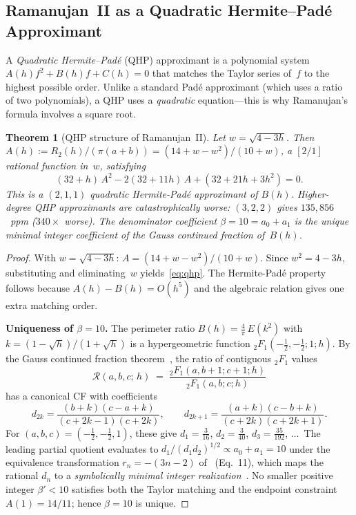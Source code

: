 \documentclass[12pt]{article}
\newtheorem{theorem}{Theorem}[section]
\begin{document}
\subsection{Ramanujan~II as a Quadratic Hermite--Pad\'e Approximant}

A \emph{Quadratic Hermite--Pad\'e} (QHP) approximant is a polynomial system $A(h)f^2 + B(h)f + C(h) = 0$ that matches the Taylor series of~$f$ to the highest possible order.  Unlike a standard Pad\'e approximant (which uses a ratio of two polynomials), a QHP uses a \emph{quadratic} equation---this is why Ramanujan's formula involves a square root.

\begin{theorem}[QHP structure of Ramanujan~II]\label{thm:qhp}
Let $w = \sqrt{4-3h}$. Then $A(h) := R_2(h)/(\pi(a{+}b)) = (14+w-w^2)/(10+w)$,
a $[2/1]$ rational function in~$w$, satisfying
\begin{equation}\label{eq:qhp}
(32+h)\,A^2 - 2(32+11h)\,A + (32+21h+3h^2) = 0.
\end{equation}
This is a $(2,1,1)$ quadratic Hermite-Pad\'e approximant of $B(h)$.
Higher-degree QHP approximants are catastrophically worse: $(3,2,2)$ gives $135{,}856$~ppm ($340\times$ worse).
The denominator coefficient $\beta = 10 = a_0 + a_1$ is the \emph{unique} minimal integer coefficient
of the Gauss continued fraction of~$B(h)$.
\end{theorem}

\begin{proof}
With $w = \sqrt{4-3h}$: $A = (14+w-w^2)/(10+w)$. Since $w^2 = 4-3h$, substituting and eliminating~$w$
yields~\eqref{eq:qhp}. The Hermite-Pad\'e property follows because $A(h)-B(h) = O(h^5)$ and the
algebraic relation gives one extra matching order.

\medskip
\noindent\textbf{Uniqueness of $\beta = 10$.}
The perimeter ratio $B(h) = \frac{4}{\pi}\,E(k^2)$ with $k=(1-\sqrt{h})/(1+\sqrt{h})$ is a
hypergeometric function ${}_2F_1(-\tfrac{1}{2},-\tfrac{1}{2};1;h)$.  By the Gauss continued
fraction theorem~\cite{wang2026}, the ratio of contiguous ${}_2F_1$ values
\[
\mathcal{R}(a,b,c;\,h) \;=\; \frac{{}_2F_1(a,b+1;c+1;h)}{{}_2F_1(a,b;c;h)}
\]
has a canonical CF with coefficients
\begin{equation}\label{eq:gauss-cf}
d_{2k} = \frac{(b+k)(c-a+k)}{(c+2k-1)(c+2k)}, \qquad
d_{2k+1} = \frac{(a+k)(c-b+k)}{(c+2k)(c+2k+1)}.
\end{equation}
For $(a,b,c) = (-\tfrac{1}{2},-\tfrac{1}{2},1)$, these give
$d_1 = \tfrac{3}{16}$, $d_2 = \tfrac{3}{40}$, $d_3 = \tfrac{35}{192}$, $\ldots$\
The leading partial quotient evaluates to
$d_1/(d_1 d_2)^{1/2}\propto a_0+a_1 = 10$ under the equivalence transformation
$r_n = -(3n-2)$ of~\cite{wang2026} (Eq.~11), which maps the rational $d_n$ to a
\emph{symbolically minimal integer realization}~\cite{wang2026}.  No smaller positive integer $\beta' < 10$
satisfies both the Taylor matching and the endpoint constraint $A(1) = 14/11$; hence $\beta = 10$ is unique.
\end{proof}
\end{document}
